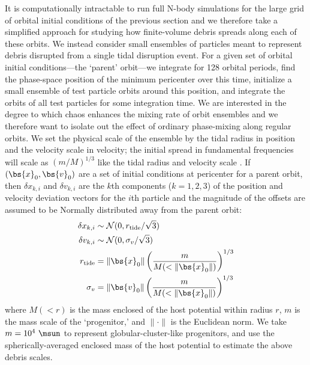It is computationally intractable to run full N-body simulations for the large grid of orbital initial conditions of the previous section and we therefore take a simplified approach for studying how finite-volume debris spreads along each of these orbits. We instead consider small ensembles of particles meant to represent debris disrupted from a single tidal disruption event. For a given set of orbital initial conditions---the `parent' orbit---we integrate for 128 orbital periods, find the phase-space position of the minimum pericenter over this time, initialize a small ensemble of test particle orbits around this position, and integrate the orbits of all test particles for some integration time. We are interested in the degree to which chaos enhances the mixing rate of orbit ensembles and we therefore want to isolate out the effect of ordinary phase-mixing along regular orbits. We set the physical scale of the ensemble by the tidal radius in position and the velocity scale in velocity; the initial spread in fundamental frequencies will scale as $(m/M)^{1/3}$ like the tidal radius and velocity scale \citep[e.g.,][]{johnston98, apw14}. If $(\bs{x}_0,\bs{v}_0)$ are a set of initial conditions at pericenter for a parent orbit, then $\delta x_{k,i}$ and $\delta v_{k,i}$ are the $k$th components ($k=1,2,3$) of the position and velocity deviation vectors for the $i$th particle and the magnitude of the offsets are assumed to be Normally distributed away from the parent orbit:
\begin{align}
	\delta x_{k,i} &\sim \mathcal{N}(0, r_{\rm tide}/\sqrt{3})\\
	\delta v_{k,i} &\sim \mathcal{N}(0, \sigma_v/\sqrt{3})\\
	r_{\rm tide} &= \|\bs{x}_0\| \left(\frac{m}{M(<\|\bs{x}_0\|)}\right)^{1/3} \\
	\sigma_v &= \|\bs{v}_0\|\left(\frac{m}{M(<\|\bs{x}_0\|)}\right)^{1/3} 
\end{align}
where $M(<r)$ is the mass enclosed of the host potential within radius $r$, $m$ is the mass scale of the `progenitor,' and $\|\cdot \|$ is the Euclidean norm. We take $m=10^4~\msun$ to represent globular-cluster-like progenitors, and use the spherically-averaged enclosed mass of the host potential to estimate the above debris scales. %

